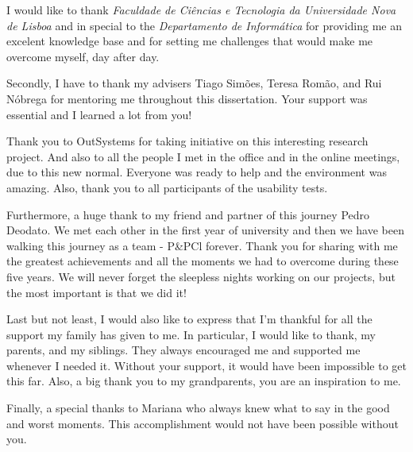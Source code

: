 \acknowledgements

I would like to thank \textit{Faculdade de Ciências e Tecnologia da Universidade Nova de Lisboa} and in special to the \textit{Departamento de Informática} for providing me an excelent knowledge base and for setting me challenges that would make me overcome myself, day after day.

Secondly, I have to thank my advisers Tiago Simões, Teresa Romão, and Rui Nóbrega for mentoring me throughout this dissertation. Your support was essential and I learned a lot from you!

Thank you to OutSystems for taking initiative on this interesting research project. And also to all the people I met in the office and in the online meetings, due to this new normal. Everyone was ready to help and the environment was amazing. Also, thank you to all participants of the usability tests.

Furthermore, a huge thank to my friend and partner of this journey Pedro Deodato. We met each other in the first year of university and then we have been walking this journey as a team - P\&PCl forever. Thank you for sharing with me the greatest achievements and all the moments we had to overcome during these five years. We will never forget the sleepless nights working on our projects, but the most important is that we did it!

Last but not least, I would also like to express that I'm thankful for all the support my family has given to me. In particular, I would like to thank, my parents, and my siblings. They always encouraged me and supported me whenever I needed it. Without your support, it would have been impossible to get this far. Also, a big thank you to my grandparents, you are an inspiration to me.

Finally, a special thanks to Mariana who always knew what to say in the good and worst moments. This accomplishment would not have been possible without you.

